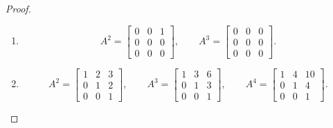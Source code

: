 \begin{proof}
    \begin{enumerate}[label={(\alph*)}]
        \item
              \[
                  A^{2} = \begin{bmatrix}
                      0 & 0 & 1 \\
                      0 & 0 & 0 \\
                      0 & 0 & 0
                  \end{bmatrix},\qquad
                  A^{3} = \begin{bmatrix}
                      0 & 0 & 0 \\
                      0 & 0 & 0 \\
                      0 & 0 & 0
                  \end{bmatrix}.
              \]
        \item
              \[
                  A^{2} = \begin{bmatrix}
                      1 & 2 & 3 \\
                      0 & 1 & 2 \\
                      0 & 0 & 1
                  \end{bmatrix},\qquad
                  A^{3} = \begin{bmatrix}
                      1 & 3 & 6 \\
                      0 & 1 & 3 \\
                      0 & 0 & 1
                  \end{bmatrix},\qquad
                  A^{4} = \begin{bmatrix}
                      1 & 4 & 10 \\
                      0 & 1 & 4  \\
                      0 & 0 & 1
                  \end{bmatrix}.
              \]
    \end{enumerate}
\end{proof}

